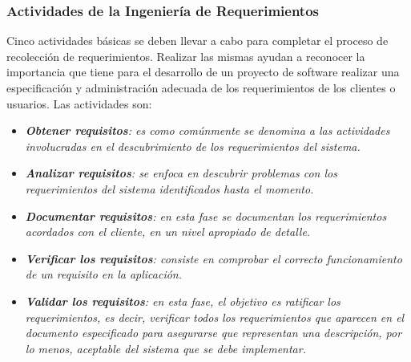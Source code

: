 \documentclass[11pt,oneside]{book}
\begin{document}
\subsubsection{Actividades de la Ingeniería de Requerimientos}
Cinco actividades básicas se deben llevar a cabo para completar el proceso de recolección de requerimientos. Realizar las mismas ayudan a reconocer la importancia que tiene para el desarrollo de un proyecto de software realizar una especificación y administración adecuada de los requerimientos de los clientes o usuarios. Las actividades son:
\begin{itemize}
\item \textit{\textbf{Obtener requisitos}: es como comúnmente se denomina a las actividades involucradas en el descubrimiento de los requerimientos del sistema.}

\item \textit{\textbf{Analizar requisitos}: se enfoca en descubrir problemas con los requerimientos del sistema identificados hasta el momento.}

\item \textit{\textbf{Documentar requisitos}: en esta fase se documentan los requerimientos acordados con el cliente, en un nivel apropiado de detalle.}

\item \textit{\textbf{Verificar los requisitos}: consiste en comprobar el correcto funcionamiento de un requisito en la aplicación.}

\item \textit{\textbf{Validar los requisitos}: en esta fase, el objetivo es ratificar los requerimientos, es decir, verificar todos los requerimientos que aparecen en el documento especificado para asegurarse que representan una descripción, por lo menos, aceptable del sistema que se debe implementar.}
\end{itemize}
\end{document}
